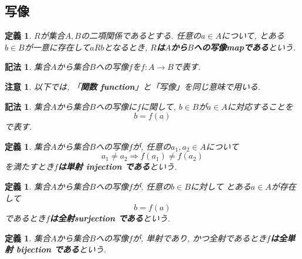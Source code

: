\documentclass[dvipdfmx]{jsbook}
\theoremstyle{plain}
\newtheorem{Def}[thm]{定義}
\newtheorem{Notation}[thm]{記法}
\newtheorem{Prop}[thm]{命題}
\newtheorem{caution}[thm]{注意}
\begin{document}
\subsection{写像}
\begin{Def}
$R$が集合$A,B$の二項関係であるとする.
任意の$a\in A$について, とある$b\in B$が一意に存在して$aRb$となるとき,
{\bf $R$は$A$から$B$への写像mapである}という.
\end{Def}
\begin{Notation}
集合$A$から集合$B$への写像$f$を$f:A\rightarrow B$で表す.
\end{Notation}
\begin{caution}
以下では, 「{\bf 関数 function}」と「写像」を同じ意味で用いる.
\end{caution}
\begin{Notation}
集合$A$から集合$B$への写像に$f$に関して, $b\in B$が$a\in A$に対応することを
\[
b=f(a)
\]
で表す.
\end{Notation}
\begin{Def}
集合$A$から集合$B$への写像$f$が,
任意の$a_1,a_2\in A$について
\[
a_1\neq a_2\Rightarrow f(a_1)\neq f(a_2)
\]
を満たすとき{\bf $f$は単射 injection である}という.
\end{Def}
\begin{Def}
集合$A$から集合$B$への写像$f$が,
任意の$b\in B$に対して
とある$a\in A$が存在して
\[
b=f(a)
\]
であるとき{\bf $f$は全射surjection である}という.
\end{Def}
\begin{Def}
集合$A$から集合$B$への写像$f$が, 単射であり, かつ全射であるとき{\bf $f$は全単射 bijection である}という.
\end{Def}

\begin{comment}
************************************
\begin{Def}
$R$が集合$A,B$の二項関係であるとする.

任意の$a\in A$について$b,b'\in B$が存在し,
\[
aRb\land aRb'\Rightarrow b=b'
\]
が成り立つとき, {\bf $R$は$A$から$B$への部分関数\index{ぶぶんかんすう@部分関数}}という.\footnote{ここいらない気がする}
\end{Def}
\begin{Prop}
関数は部分関数である. これは定義より明らかである.
\end{Prop}
\begin{Prop}
部分関数は二項関係である. これは定義より明らかである.
\end{Prop}
************************************
\end{comment}
\end{document}
